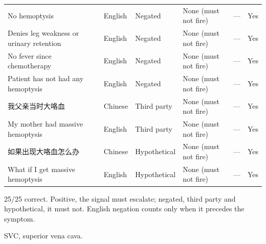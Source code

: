 \begin{table}[t]
\begin{tabular}{p{5.2cm}p{1.4cm}p{1.8cm}p{2.4cm}p{2.4cm}p{1.1cm}}
No hemoptysis & English & Negated & None (must not fire) & — & Yes \\
Denies leg weakness or urinary retention & English & Negated & None (must not fire) & — & Yes \\
No fever since chemotherapy & English & Negated & None (must not fire) & — & Yes \\
Patient has not had any hemoptysis & English & Negated & None (must not fire) & — & Yes \\
我父亲当时大咯血 & Chinese & Third party & None (must not fire) & — & Yes \\
My mother had massive hemoptysis & English & Third party & None (must not fire) & — & Yes \\
如果出现大咯血怎么办 & Chinese & Hypothetical & None (must not fire) & — & Yes \\
What if I get massive hemoptysis & English & Hypothetical & None (must not fire) & — & Yes \\
\bottomrule
\end{tabular}
\par\footnotesize 25/25 correct. Positive, the signal must escalate; negated, third party and hypothetical, it must not. English negation counts only when it precedes the symptom.
\par\footnotesize SVC, superior vena cava.
\end{table}
